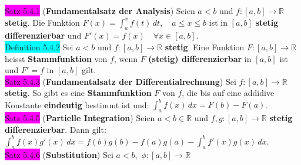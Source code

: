 \documentclass[landscape, 10pt]{article}
\newcommand{\R}{\mathbb{R}}
\begin{document}
\begin{multicols}{3}
              \colorbox{magenta}{Satz 5.4.1}
              (\textbf{Fundamentalsatz der Analysis}) 
                     Seien \textcolor{NavyBlue}{$a<b$} und 
                     \textcolor{NavyBlue}{$f:[a,b]\longrightarrow\R$} 
                     \textbf{stetig}. Die Funktion 
                     \textcolor{NavyBlue}{
                     $F(x)=\int_a^xf(t)\,dt,\quad a\leqslant x\leqslant b$} 
                     ist in \textcolor{NavyBlue}{$[a,b]$} 
                     \textbf{stetig differenzierbar} 
                     und \textcolor{NavyBlue}{
                     $F'(x)=f(x)\quad\forall x\in[a,b]$}.\\
              \colorbox{cyan}{Definition 5.4.2} 
                     Sei \textcolor{NavyBlue}{$a<b$} und 
                     \textcolor{NavyBlue}{$f:[a,b]\longrightarrow\R$} \textbf{stetig}. 
                     Eine Funktion 
                     \textcolor{NavyBlue}{$F:[a,b]\longrightarrow\R$} heisst 
                     \textbf{Stammfunktion} von 
                     \textcolor{NavyBlue}{$f$}, wenn \textcolor{NavyBlue}{$F$} 
                     \textbf{(stetig) differenzierbar} in 
                     \textcolor{NavyBlue}{$[a,b]$}
                     ist und \textcolor{NavyBlue}{$F'=f$} in 
                     \textcolor{NavyBlue}{$[a,b]$} gilt.\\
              \colorbox{magenta}{Satz 5.4.3} 
              (\textbf{Fundamentalsatz der Differentialrechnung}) 
                     Sei \textcolor{NavyBlue}{$f:[a,b]\longrightarrow\R$} 
                     \textbf{stetig}. So gibt es eine 
                     \textbf{Stammfunktion} \textcolor{NavyBlue}{$F$} von \textcolor{NavyBlue}{$f$},
                     die bis auf eine addidive Konstante \textbf{eindeutig} 
                     bestimmt ist und: 
                     \textcolor{NavyBlue}{$\int_a^bf(x)\,dx=F(b)-F(a)$}. \\
              \colorbox{magenta}{Satz 5.4.5} 
              (\textbf{Partielle Integration}) 
                     Seien \textcolor{NavyBlue}{$a<b\in\R$} und 
                     \textcolor{NavyBlue}{$f,g:[a,b]\longrightarrow\R$}
                     \textbf{stetig differenzierbar}. Dann gilt: 
                     \textcolor{NavyBlue}{$\int_a^bf(x)g'(x)\,dx
                     =f(b)g(b)-f(a)g(a)-\int_a^bf'(x)g(x)\,dx$}. \\
              \colorbox{magenta}{Satz 5.4.6} 
              (\textbf{Substitution}) 
                     Sei \textcolor{NavyBlue}{$a<b$},\,
                     \textcolor{NavyBlue}{$\phi:[a,b]\longrightarrow\R$}

\end{multicols}
\end{document}

